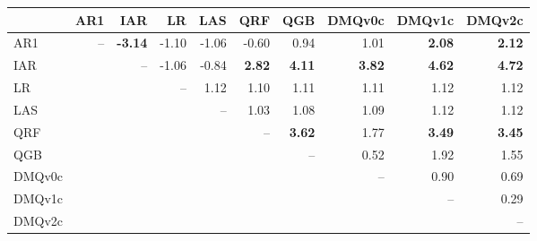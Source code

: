 \begin{tabular}{lrrrrrrrrr}
\toprule
 & AR1 & IAR & LR & LAS & QRF & QGB & DMQv0c & DMQv1c & DMQv2c \\
\midrule
AR1 & -- & \textbf{-3.14} & -1.10 & -1.06 & -0.60 & 0.94 & 1.01 & \textbf{2.08} & \textbf{2.12} \\
IAR &  & -- & -1.06 & -0.84 & \textbf{2.82} & \textbf{4.11} & \textbf{3.82} & \textbf{4.62} & \textbf{4.72} \\
LR &  &  & -- & 1.12 & 1.10 & 1.11 & 1.11 & 1.12 & 1.12 \\
LAS &  &  &  & -- & 1.03 & 1.08 & 1.09 & 1.12 & 1.12 \\
QRF &  &  &  &  & -- & \textbf{3.62} & 1.77 & \textbf{3.49} & \textbf{3.45} \\
QGB &  &  &  &  &  & -- & 0.52 & 1.92 & 1.55 \\
DMQv0c &  &  &  &  &  &  & -- & 0.90 & 0.69 \\
DMQv1c &  &  &  &  &  &  &  & -- & 0.29 \\
DMQv2c &  &  &  &  &  &  &  &  & -- \\
\bottomrule
\end{tabular}
